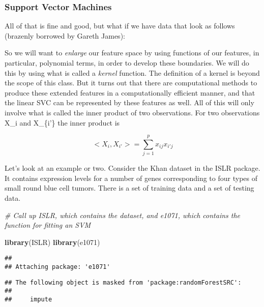 \documentclass[]{article}
\newenvironment{Shaded}{\begin{snugshade}}{\end{snugshade}}
\newcommand{\KeywordTok}[1]{\textcolor[rgb]{0.13,0.29,0.53}{\textbf{#1}}}
\newcommand{\CommentTok}[1]{\textcolor[rgb]{0.56,0.35,0.01}{\textit{#1}}}
\newcommand{\NormalTok}[1]{#1}
\begin{document}
\subsubsection{Support Vector Machines}\label{support-vector-machines}

All of that is fine and good, but what if we have data that look as
follows (brazenly borrowed by Gareth James):

So we will want to \emph{enlarge} our feature space by using functions
of our features, in particular, polynomial terms, in order to develop
these boundaries. We will do this by using what is called a
\emph{kernel} function. The definition of a kernel is beyond the scope
of this class. But it turns out that there are computational methods to
produce these extended features in a computationally efficient manner,
and that the linear SVC can be represented by these features as well.
All of this will only involve what is called the inner product of two
observations. For two observations X\_i and X\_\{i'\} the inner product
is

\begin{equation}



<X_i, X_{i'}> = \sum_{j=1}^{p} {x_{ij}x_{i'j}}

\end{equation}

Let's look at an example or two. Consider the Khan dataset in the ISLR
package. It contains expression levels for a number of genes
corresponding to four types of small round blue cell tumors. There is a
set of training data and a set of testing data.

\begin{Shaded}
\begin{Highlighting}[]
\CommentTok{# Call up ISLR, which contains the dataset, and e1071, which contains the function for fitting an SVM}

\KeywordTok{library}\NormalTok{(ISLR)}
\KeywordTok{library}\NormalTok{(e1071)}
\end{Highlighting}
\end{Shaded}

\begin{verbatim}
## 
## Attaching package: 'e1071'
\end{verbatim}

\begin{verbatim}
## The following object is masked from 'package:randomForestSRC':
## 
##     impute
\end{verbatim}
\end{document}
